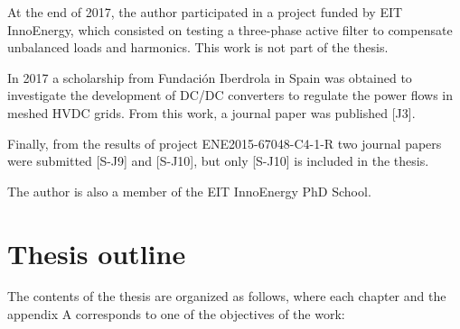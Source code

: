 	At the end of 2017, the author participated in a project funded by EIT InnoEnergy, which consisted on testing a three-phase active filter to compensate unbalanced loads and harmonics. This work is not part of the thesis.
	
	In 2017 a scholarship from Fundaci\'{o}n Iberdrola in Spain was obtained to investigate the development of DC/DC converters to regulate the power flows in meshed HVDC grids. From this work, a journal paper was published [J3].
	
	Finally, from the results of project ENE2015-67048-C4-1-R two journal papers were submitted [S-J9] and [S-J10], but only [S-J10] is included in the thesis.
	
	The author is also a member of the EIT InnoEnergy PhD School.
	
	

\newpage 
	\section{Thesis outline}
	
	The contents of the thesis are organized as follows, where each chapter and the appendix A corresponds to one of the objectives of the work:
	
